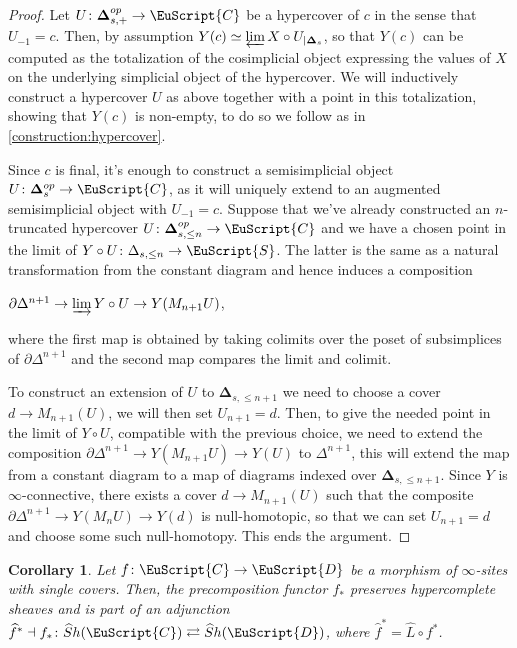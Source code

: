 \documentclass[oneside,a4paper]{amsart}
\newcommand{\euscr}[1]{\EuScript{#1}} %
\newcommand{\ccat}{\euscr{C}} %
\newcommand{\dcat}{\euscr{D}} %
\newcommand{\spaces}{\euscr{S}} %
\newcommand{\hpsheaves}{\widehat{S}h} %
\newcommand{\thickdelta}{\mathbf{\Delta}} %
\theoremstyle{plain}
\newtheorem{cor}[thm]{Corollary}
\theoremstyle{definition}
\theoremstyle{remark}
\begin{document}
\begin{proof}
Let $U \colon \thickdelta^{op}_{s, +} \rightarrow \ccat$ be a hypercover of $c$ in the sense that $U_{-1} = c$. Then, by assumption $Y(c) \simeq \varprojlim X \circ U _{| \thickdelta_{s}}$, so that $Y(c)$ can be computed as the totalization of the cosimplicial object expressing the values of $X$ on the underlying simplicial object of the hypercover. We will inductively construct a hypercover $U$ as above together with a point in this totalization, showing that $Y(c)$ is non-empty, to do so we follow as in \cref{construction:hypercover}.

Since $c$ is final, it's enough to construct a semisimplicial object $U \colon \thickdelta_{s}^{op} \rightarrow \ccat$, as it will uniquely extend to an augmented semisimplicial object with $U_{-1} = c$.  Suppose that we've already constructed an $n$-truncated hypercover $U \colon \thickdelta_{s, \leq n}^{op} \rightarrow \ccat$ and we have a chosen point in the limit of $Y \circ U \colon \Delta_{s, \leq n} \rightarrow \spaces$. The latter is the same as a natural transformation from the constant diagram and hence induces a composition

\begin{center}
$\partial \Delta^{n+1} \rightarrow \varinjlim Y \circ U \rightarrow Y(M_{n+1}U)$,
\end{center}
where the first map is obtained by taking colimits over the poset of subsimplices of $\partial \Delta^{n+1}$ and the second map compares the limit and colimit. 

To construct an extension of $U$ to $\thickdelta_{s, \leq n+1}$ we need to choose a cover $d \rightarrow M_{n+1}(U)$, we will then set $U_{n+1} = d$.  Then, to give the needed point in the limit of $Y \circ U$, compatible with the previous choice, we need to extend the composition $\partial \Delta^{n+1} \rightarrow Y(M_{n+1}U) \rightarrow Y(U)$ to $\Delta^{n+1}$, this will extend the map from a constant diagram to a map of diagrams indexed over $\thickdelta_{s, \leq n+1}$. Since $Y$ is $\infty$-connective, there exists a cover $d \rightarrow M_{n+1}(U)$ such that the composite $\partial \Delta^{n+1} \rightarrow Y(M_{n}U) \rightarrow Y(d)$ is null-homotopic, so that we can set $U_{n+1} = d$ and choose some such null-homotopy. This ends the argument. 
\end{proof}

\begin{cor}
\label{cor:precomposition_with_compatible_functors_preserves_hypercomplete_sheaves}
Let $f \colon \ccat \rightarrow \dcat$ be a morphism of $\infty$-sites with single covers. Then, the precomposition functor $f_{*}$ preserves hypercomplete sheaves and is part of an adjunction $\widehat{f}^{*} \dashv f_{*} \colon \hpsheaves(\ccat) \rightleftarrows \hpsheaves(\dcat)$, where $\widehat{f}^{*} = \widehat{L} \circ f^{*}$.
\end{cor}
\end{document}

